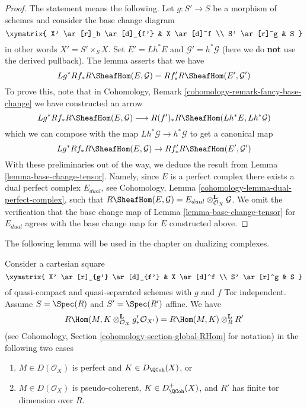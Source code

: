 \begin{proof}
The statement means the following. Let $g : S' \to S$ be a morphism of
schemes and consider the base change diagram
$$
\xymatrix{
X' \ar[r]_h \ar[d]_{f'} &
X \ar[d]^f \\
S' \ar[r]^g &
S
}
$$
in other words $X' = S' \times_S X$. Set $E' = Lh^*E$ and
$\mathcal{G}' = h^*\mathcal{G}$ (here we do {\bf not} use the derived
pullback). The lemma asserts that we have
$$
Lg^*Rf_*R\SheafHom(E, \mathcal{G}) = Rf'_*R\SheafHom(E', \mathcal{G}')
$$
To prove this, note that in
Cohomology, Remark \ref{cohomology-remark-fancy-base-change}
we have constructed an arrow
$$
Lg^*Rf_*R\SheafHom(E, \mathcal{G})
\longrightarrow
R(f')_*R\SheafHom(Lh^*E, Lh^*\mathcal{G})
$$
which we can compose with the map $Lh^*\mathcal{G} \to h^*\mathcal{G}$
to get a canonical map
$$
Lg^*Rf_*R\SheafHom(E, \mathcal{G}) \to Rf'_*R\SheafHom(E', \mathcal{G}')
$$
With these preliminaries out of the way, we deduce the result from
Lemma \ref{lemma-base-change-tensor}. Namely, since $E$ is a perfect
complex there exists a dual perfect complex $E_{dual}$, see
Cohomology, Lemma \ref{cohomology-lemma-dual-perfect-complex}, such
that $R\SheafHom(E, \mathcal{G}) =
E_{dual} \otimes_{\mathcal{O}_X}^\mathbf{L} \mathcal{G}$.
We omit the verification that the base change map of
Lemma \ref{lemma-base-change-tensor} for $E_{dual}$ agrees with the
base change map for $E$ constructed above.
\end{proof}

\noindent
The following lemma will be used in the chapter on dualizing complexes.

\begin{lemma}
\label{lemma-affine-morphism-and-hom-out-of-perfect}
Consider a cartesian square
$$
\xymatrix{
X' \ar[r]_{g'} \ar[d]_{f'} & X \ar[d]^f \\
S' \ar[r]^g & S
}
$$
of quasi-compact and quasi-separated schemes with $g$ and $f$ Tor independent.
Assume $S = \Spec(R)$ and $S' = \Spec(R')$ affine. We have
$$
R\Hom(M, K \otimes^\mathbf{L}_{\mathcal{O}_X} g'_*\mathcal{O}_{X'}) =
R\Hom(M, K) \otimes^\mathbf{L}_R R'
$$
(see Cohomology, Section \ref{cohomology-section-global-RHom} for notation)
in the following two cases
\begin{enumerate}
\item $M \in D(\mathcal{O}_X)$ is perfect and $K \in D_\QCoh(X)$, or
\item $M \in D(\mathcal{O}_X)$ is pseudo-coherent,
$K \in D_\QCoh^+(X)$, and $R'$ has finite tor dimension over $R$.
\end{enumerate}
\end{lemma}

